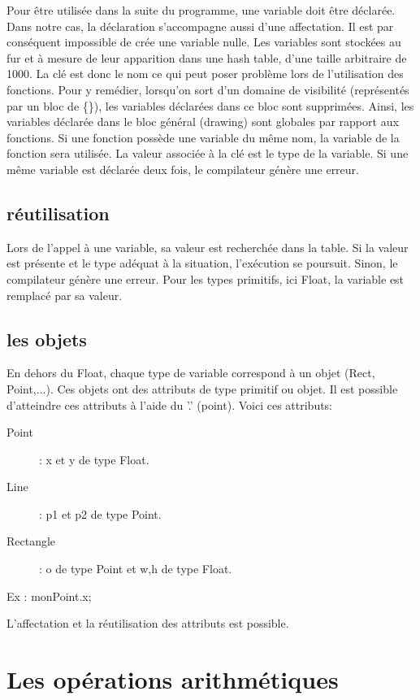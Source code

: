 \documentclass[11pt]{report} %
\begin{document}
Pour être utilisée dans la suite du programme, une variable doit être déclarée. Dans notre cas, la déclaration s'accompagne aussi d'une affectation. Il est par conséquent impossible de crée une variable nulle. Les variables sont stockées au fur et à mesure de leur apparition dans une hash table, d'une taille arbitraire de 1000. La clé est donc le nom ce qui peut poser problème lors de l'utilisation des fonctions. Pour y remédier, lorsqu'on sort d'un domaine de visibilité (représentés par un bloc de  \{\}), les variables déclarées dans ce bloc sont supprimées. Ainsi, les variables déclarée dans le bloc général (drawing) sont globales par rapport aux fonctions. Si une fonction possède une variable du même nom, la variable de la fonction sera utilisée. La valeur associée à la clé est le type de la variable.
Si une même variable est déclarée deux fois, le compilateur génère une erreur. 

\subsection{réutilisation}

Lors de l'appel à une variable, sa valeur est recherchée dans la table. Si la valeur est présente et le type adéquat à la situation, l'exécution se poursuit. Sinon, le compilateur génère une erreur. Pour les types primitifs, ici Float, la variable est remplacé par sa valeur.

\subsection{les objets}

En dehors du Float, chaque type de variable correspond à un objet (Rect, Point,...). Ces objets ont des attributs de type primitif ou objet. Il est possible d'atteindre ces attributs à l'aide du '.' (point). Voici ces attributs:
\begin{description}
\item[Point]: x et y de type Float.
\item[Line]: p1 et p2 de type Point.
\item[Rectangle]: o de type Point et w,h de type Float.
\end{description}

Ex :
monPoint.x;

L'affectation et la réutilisation des attributs est possible.

\section{Les opérations arithmétiques}
\end{document}
